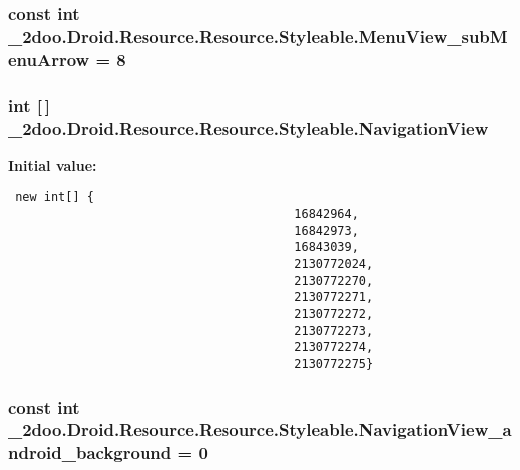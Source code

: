 \hypertarget{class__2doo_1_1_droid_1_1_resource_1_1_styleable_b5d7130fde4a237ecd92b8084434f3ab}{
\subsubsection[{MenuView\_\-subMenuArrow}]{\setlength{\rightskip}{0pt plus 5cm}const int \_\-2doo.Droid.Resource.Resource.Styleable.MenuView\_\-subMenuArrow = 8}}
\label{class__2doo_1_1_droid_1_1_resource_1_1_styleable_b5d7130fde4a237ecd92b8084434f3ab}


\hypertarget{class__2doo_1_1_droid_1_1_resource_1_1_styleable_6ca2169b7cc4c0b8180a9ce142a02cf8}{
\subsubsection[{NavigationView}]{\setlength{\rightskip}{0pt plus 5cm}int \mbox{[}$\,$\mbox{]} \_\-2doo.Droid.Resource.Resource.Styleable.NavigationView}}
\label{class__2doo_1_1_droid_1_1_resource_1_1_styleable_6ca2169b7cc4c0b8180a9ce142a02cf8}


\textbf{Initial value:}

\begin{Code}\begin{verbatim} new int[] {
                                        16842964,
                                        16842973,
                                        16843039,
                                        2130772024,
                                        2130772270,
                                        2130772271,
                                        2130772272,
                                        2130772273,
                                        2130772274,
                                        2130772275}
\end{verbatim}
\end{Code}
\hypertarget{class__2doo_1_1_droid_1_1_resource_1_1_styleable_45b609a33b0ec6f439944b833deecd9d}{
\subsubsection[{NavigationView\_\-android\_\-background}]{\setlength{\rightskip}{0pt plus 5cm}const int \_\-2doo.Droid.Resource.Resource.Styleable.NavigationView\_\-android\_\-background = 0}}
\label{class__2doo_1_1_droid_1_1_resource_1_1_styleable_45b609a33b0ec6f439944b833deecd9d}


